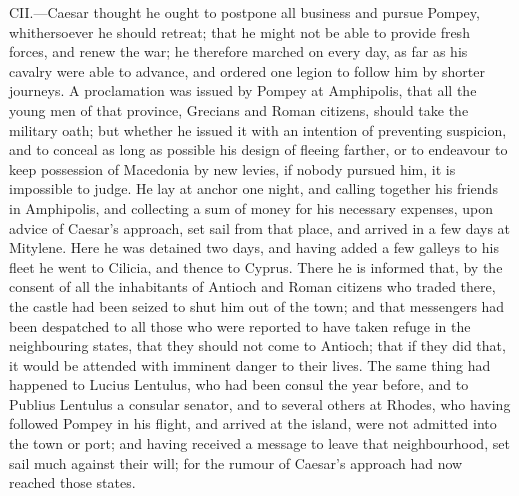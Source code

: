 CII.—Caesar thought he ought to postpone all business and pursue
Pompey, whithersoever he should retreat; that he might not be able to
provide fresh forces, and renew the war; he therefore marched on every
day, as far as his cavalry were able to advance, and ordered one legion
to follow him by shorter journeys. A proclamation was issued by Pompey
at Amphipolis, that all the young men of that province, Grecians and
Roman citizens, should take the military oath; but whether he issued it
with an intention of preventing suspicion, and to conceal as long as
possible his design of fleeing farther, or to endeavour to keep
possession of Macedonia by new levies, if nobody pursued him, it is
impossible to judge. He lay at anchor one night, and calling together
his friends in Amphipolis, and collecting a sum of money for his
necessary expenses, upon advice of Caesar's approach, set sail from that
place, and arrived in a few days at Mitylene. Here he was detained two
days, and having added a few galleys to his fleet he went to Cilicia,
and thence to Cyprus. There he is informed that, by the consent of all
the inhabitants of Antioch and Roman citizens who traded there, the
castle had been seized to shut him out of the town; and that messengers
had been despatched to all those who were reported to have taken refuge
in the neighbouring states, that they should not come to Antioch; that
if they did that, it would be attended with imminent danger to their
lives. The same thing had happened to Lucius Lentulus, who had been
consul the year before, and to Publius Lentulus a consular senator, and
to several others at Rhodes, who having followed Pompey in his flight,
and arrived at the island, were not admitted into the town or port; and
having received a message to leave that neighbourhood, set sail much
against their will; for the rumour of Caesar's approach had now reached
those states.


